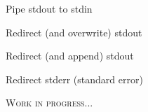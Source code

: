 \documentclass[12pt, a4paper]
{article}
\begin{document}
\begin{multicols}{3}

\begin{description}[nolistsep]
	\item[|] Pipe stdout to stdin
	\item[>] Redirect (and overwrite) stdout
	\item[>>] Redirect (and append) stdout 
	\item[2>] Redirect stderr (standard error)
\end{description}

\end{multicols}

\begin{center}
	\Huge \textsc{Work in progress...}
\end{center}
\end{document}
